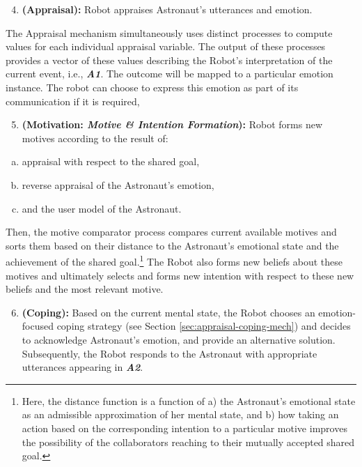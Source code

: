 \begin{enumerate}
  \setcounter{enumi}{3}
  \item \textbf{(Appraisal):} Robot appraises Astronaut's utterances and
  emotion.
\end{enumerate}

The Appraisal mechanism simultaneously uses distinct processes to compute values
for each individual appraisal variable. The output of these processes provides a
vector of these values describing the Robot's interpretation of the current
event, i.e., \textit{\textbf{A1}}. The outcome will be mapped to a particular
emotion instance. The robot can choose to express this emotion as part of its
communication if it is required,

\begin{enumerate}
  \setcounter{enumi}{4}
  \item \textbf{(Motivation: \textit{Motive \& Intention Formation}):} Robot
  forms new motives according to the result of:
\end{enumerate}

\begin{enumerate}[a)]
  \item appraisal with respect to the shared goal,
  \item reverse appraisal of the Astronaut's emotion,
  \item and the user model of the Astronaut. 
\end{enumerate}

Then, the motive comparator process compares current available motives and
sorts them based on their distance to the Astronaut's emotional state and
the achievement of the shared goal.\footnote{Here, the distance function is a
function of a) the Astronaut's emotional state as an admissible approximation
of her mental state, and b) how taking an action based on the corresponding
intention to a particular motive improves the possibility of the collaborators
reaching to their mutually accepted shared goal.} The Robot also forms new
beliefs about these motives and ultimately selects and forms new intention with
respect to these new beliefs and the most relevant motive.

\begin{enumerate}
  \setcounter{enumi}{5}
  \item \textbf{(Coping):} Based on the current mental state, the Robot chooses
  an emotion-focused coping strategy (see Section
  \ref{sec:appraisal-coping-mech}) and decides to acknowledge Astronaut's
  emotion, and provide an alternative solution. Subsequently, the Robot responds
  to the Astronaut with appropriate utterances appearing in
  \textit{\textbf{A2}}.
\end{enumerate}


